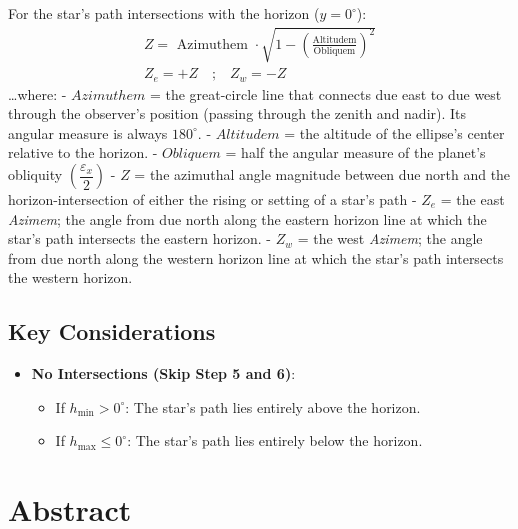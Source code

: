 \documentclass[
  letterpaper,
]{book}
\providecommand{\tightlist}{%
  \setlength{\itemsep}{0pt}\setlength{\parskip}{0pt}}
\begin{document}
For the star's path intersections with the horizon (\(y = 0^\circ\)): \[
\begin{gather}
Z = \text{ Azimuthem } \cdot \sqrt{1 - \left(\frac{\text{Altitudem}}{\text{Obliquem}}\right)^2} \\
Z_e = +Z \quad\text{;}\quad Z_w = -Z
\end{gather}
\] \ldots where: - \(Azimuthem\) = the great-circle line that connects
due east to due west through the observer's position (passing through
the zenith and nadir). Its angular measure is always \(180^\circ\). -
\(Altitudem\) = the altitude of the ellipse's center relative to the
horizon. - \(Obliquem\) = half the angular measure of the planet's
obliquity \(\left(\dfrac{\varepsilon_x}{2}\right)\) - \(Z\) = the
azimuthal angle magnitude between due north and the horizon-intersection
of either the rising or setting of a star's path - \(Z_e\) = the east
\emph{Azimem}; the angle from due north along the eastern horizon line
at which the star's path intersects the eastern horizon. - \(Z_w\) = the
west \emph{Azimem}; the angle from due north along the western horizon
line at which the star's path intersects the western horizon.

\subsection{\texorpdfstring{\textbf{Key
Considerations}}{Key Considerations}}\label{key-considerations}

\begin{itemize}
\tightlist
\item
  \textbf{No Intersections (Skip Step 5 and 6)}:

  \begin{itemize}
  \tightlist
  \item
    If \(h_\text{min} > 0^\circ\): The star's path lies entirely above
    the horizon.
  \item
    If \(h_\text{max} \leq 0^\circ\): The star's path lies entirely
    below the horizon.
  \end{itemize}
\end{itemize}

\section{Abstract}\label{abstract-30}
\end{document}
